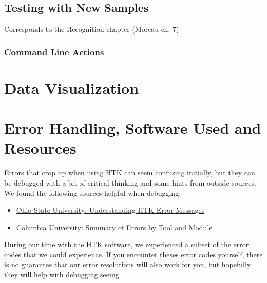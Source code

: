 \documentclass{wileySev}
\begin{document}
\chapter{Testing with New Samples}
Corresponds to the Recognition chapter (Moreau ch. 7)
\section{Command Line Actions}

\part{Data Visualization}

\part{Error Handling, Software Used and Resources}

Errors that crop up when using HTK can seem confusing initially, but they can be debugged with a bit of critical thinking and some hints from outside sources. We found the following sources helpful when debugging:
\begin{itemize}
\item \href{http://www.ling.ohio-state.edu/~bromberg/htk_problems.html}{Ohio State University: Understanding HTK Error Messages}
\item \href{http://www.ee.columbia.edu/~dpwe/LabROSA/doc/HTKBook21/node256.html}{Columbia University: Summary of Errors by Tool and Module}
\end{itemize}

During our time with the HTK software, we experienced a subset of the error codes that we could experience. If you encounter theses error codes yourself, there is no guarantee that our error resolutions will also work for you, but hopefully they will help with debugging seeing 
\end{document}
